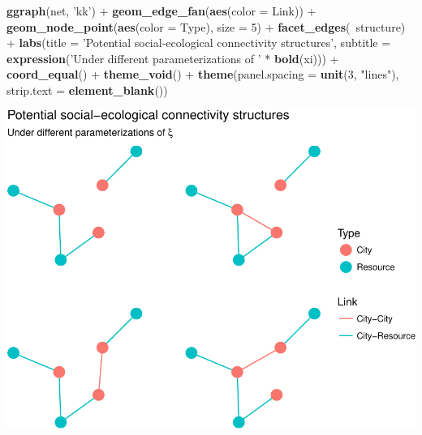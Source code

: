 \documentclass[]{article}
\newenvironment{Shaded}{}{}
\newcommand{\KeywordTok}[1]{\textcolor[rgb]{0.00,0.44,0.13}{\textbf{{#1}}}}
\newcommand{\DataTypeTok}[1]{\textcolor[rgb]{0.56,0.13,0.00}{{#1}}}
\newcommand{\DecValTok}[1]{\textcolor[rgb]{0.25,0.63,0.44}{{#1}}}
\newcommand{\StringTok}[1]{\textcolor[rgb]{0.25,0.44,0.63}{{#1}}}
\newcommand{\CommentTok}[1]{\textcolor[rgb]{0.38,0.63,0.69}{\textit{{#1}}}}
\newcommand{\NormalTok}[1]{{#1}}
\begin{document}
\begin{Shaded}
\begin{Highlighting}[]
{\end{Highlighting}
\end{Shaded}

\begin{Shaded}
\begin{Highlighting}[]
\KeywordTok{ggraph}\NormalTok{(net, }\StringTok{'kk'}\NormalTok{) +}
\StringTok{  }\KeywordTok{geom_edge_fan}\NormalTok{(}\KeywordTok{aes}\NormalTok{(}\DataTypeTok{color =} \NormalTok{Link)) +}
\StringTok{  }\KeywordTok{geom_node_point}\NormalTok{(}\KeywordTok{aes}\NormalTok{(}\DataTypeTok{color =} \NormalTok{Type), }\DataTypeTok{size =} \DecValTok{5}\NormalTok{) +}
\StringTok{  }\KeywordTok{facet_edges}\NormalTok{(~structure) +}
\StringTok{  }\KeywordTok{labs}\NormalTok{(}\DataTypeTok{title =} \StringTok{'Potential social-ecological connectivity structures'}\NormalTok{, }\DataTypeTok{subtitle =} \KeywordTok{expression}\NormalTok{(}\StringTok{'Under different parameterizations of '} \NormalTok{*}\StringTok{ }\KeywordTok{bold}\NormalTok{(xi))) +}
\StringTok{  }\KeywordTok{coord_equal}\NormalTok{() +}
\StringTok{  }\KeywordTok{theme_void}\NormalTok{() +}
\StringTok{  }\KeywordTok{theme}\NormalTok{(}\DataTypeTok{panel.spacing =} \KeywordTok{unit}\NormalTok{(}\DecValTok{3}\NormalTok{, }\StringTok{"lines"}\NormalTok{), }\DataTypeTok{strip.text =} \KeywordTok{element_blank}\NormalTok{())}
\end{Highlighting}
\end{Shaded}

\includegraphics{eq_pop_files/figure-latex/connectivity-1.pdf}

\begin{Shaded}
\end{Shaded}
\end{document}
